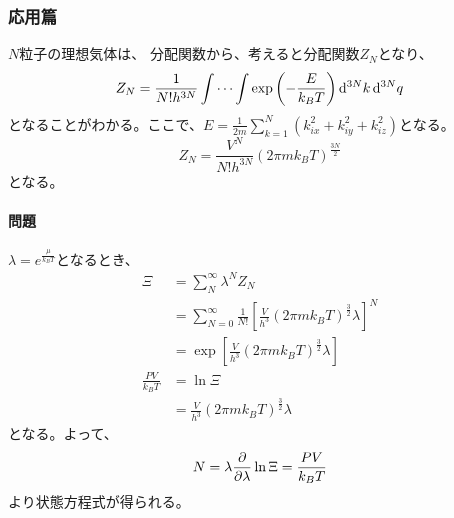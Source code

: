 \documentclass[titlepage]{ltjsarticle}
\begin{document}
\subsubsection*{応用篇}
\(N\)粒子の理想気体は、
分配関数から、考えると分配関数\(Z_N\)となり、
\begin{equation}
  Z_N = \frac{1}{N!h^{3N}} \int \cdots \int \exp \left( - \frac{E}{k_BT} \right) \odif[order=3N]{k} \odif[order=3N]{q}
\end{equation}
となることがわかる。ここで、\(E = \frac{1}{2m}\sum^{N}_{k=1}(k^2_{ix}+k^2_{iy}+k^2_{iz})\)となる。
\begin{equation}\label{eq:0.3}\label{eq:0.3}
  Z_N = \frac{V^N}{N!h^{3N}} \left( 2 \pi m k_BT \right)^{\frac{3N}{2}}
\end{equation}
となる。


\paragraph{問題}
\(\lambda=e^{\frac{\mu}{k_BT}}\)となるとき、
\begin{align}
  \Xi &= \sum_N^{\infty} \lambda^{N} Z_N \\
      & = \sum_{N=0}^{\infty}\frac{1}{N!} \left[ \frac{V}{h^3}(2\pi m k_BT )^{\frac{3}{2}}\lambda \right]^N \\
      & = \exp \left[ \frac{V}{h^3}(2\pi m k_BT )^{\frac{3}{2}}\lambda \right]\\
      \frac{PV}{k_BT} & = \ln \Xi \\
      & = \frac{V}{h^3}(2 \pi m k_B T)^{\frac{3}{2}}\lambda
\end{align}
となる。よって、
\begin{equation}
  N = \lambda \pdv{}{\lambda} \ln \Xi = \frac{PV}{k_BT}  
\end{equation}
より状態方程式が得られる。
\end{document}
